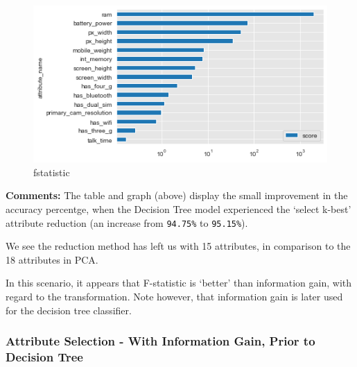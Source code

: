 \documentclass[11pt]{article}
\begin{document}
    \begin{figure}
\centering
\includegraphics{project_with_report_files/project_with_report_163_1.png}
\caption{fstatistic}
\end{figure}

    \textbf{Comments:} The table and graph (above) display the small
improvement in the accuracy percentge, when the Decision Tree model
experienced the `select k-best' attribute reduction (an increase from
\texttt{94.75\%} to \texttt{95.15\%}).

We see the reduction method has left us with 15 attributes, in
comparison to the 18 attributes in PCA.

In this scenario, it appears that F-statistic is `better' than
information gain, with regard to the transformation. Note however, that
information gain is later used for the decision tree classifier.

    \hypertarget{attribute-selection---with-information-gain-prior-to-decision-tree}{%
\subsubsection{Attribute Selection - With Information Gain, Prior to
Decision
Tree}\label{attribute-selection---with-information-gain-prior-to-decision-tree}}
\end{document}
